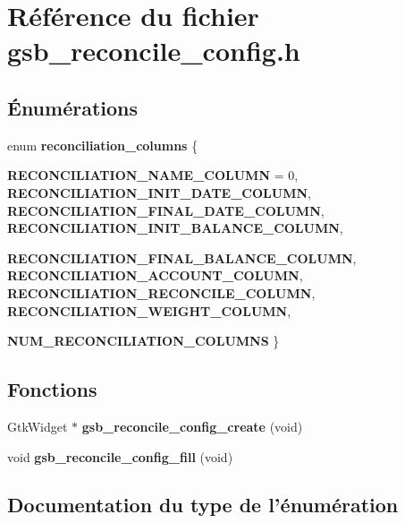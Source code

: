 \section{Référence du fichier gsb\_\-reconcile\_\-config.h}
\label{gsb__reconcile__config_8h}
\subsection*{Énumérations}
\begin{DoxyCompactItemize}
\item 
enum {\bf reconciliation\_\-columns} \{ \par
{\bf RECONCILIATION\_\-NAME\_\-COLUMN} =  0, 
{\bf RECONCILIATION\_\-INIT\_\-DATE\_\-COLUMN}, 
{\bf RECONCILIATION\_\-FINAL\_\-DATE\_\-COLUMN}, 
{\bf RECONCILIATION\_\-INIT\_\-BALANCE\_\-COLUMN}, 
\par
{\bf RECONCILIATION\_\-FINAL\_\-BALANCE\_\-COLUMN}, 
{\bf RECONCILIATION\_\-ACCOUNT\_\-COLUMN}, 
{\bf RECONCILIATION\_\-RECONCILE\_\-COLUMN}, 
{\bf RECONCILIATION\_\-WEIGHT\_\-COLUMN}, 
\par
{\bf NUM\_\-RECONCILIATION\_\-COLUMNS}
 \}
\end{DoxyCompactItemize}
\subsection*{Fonctions}
\begin{DoxyCompactItemize}
\item 
GtkWidget $\ast$ {\bf gsb\_\-reconcile\_\-config\_\-create} (void)
\item 
void {\bf gsb\_\-reconcile\_\-config\_\-fill} (void)
\end{DoxyCompactItemize}


\subsection{Documentation du type de l'énumération}
